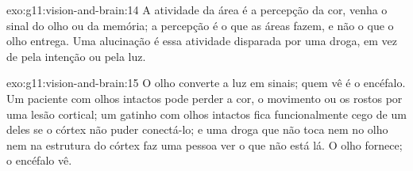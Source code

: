\begin{solution}{exo:g11:vision-and-brain:14}
A atividade da área é a percepção da cor, venha o sinal do olho ou da
memória; a percepção é o que as áreas fazem, e não o que o olho
entrega. Uma alucinação é essa atividade disparada por uma droga, em
vez de pela intenção ou pela luz.
\end{solution}

\begin{solution}{exo:g11:vision-and-brain:15}
O olho converte a luz em sinais; quem vê é o encéfalo. Um paciente com
olhos intactos pode perder a cor, o movimento ou os rostos por uma
lesão cortical; um gatinho com olhos intactos fica funcionalmente cego
de um deles se o córtex não puder conectá-lo; e uma droga que não toca
nem no olho nem na estrutura do córtex faz uma pessoa ver o que não
está lá. O olho fornece; o encéfalo vê.
\end{solution}

